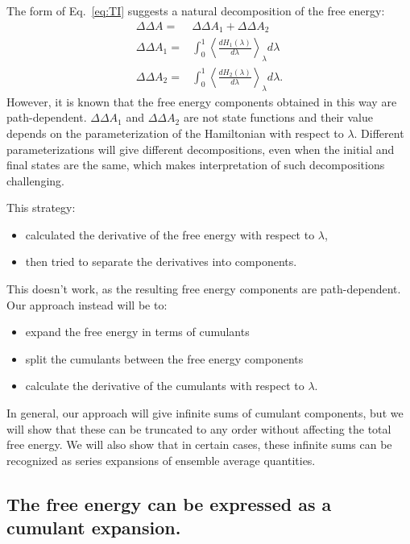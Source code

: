 \documentclass{article}
\begin{document}
The form of Eq.~\ref{eq:TI} suggests a natural decomposition of the free energy:
\begin{align}
\Delta\Delta A =& \Delta\Delta A_1 + \Delta\Delta A_2 \nonumber\\
\Delta\Delta A_1 =&
	\int_0^1 \left\langle \frac{dH_1(\lambda)}{d\lambda}\right\rangle_\lambda d\lambda \nonumber\\
\Delta\Delta A_2 =&
	\int_0^1 \left\langle \frac{dH_2(\lambda)}{d\lambda}\right\rangle_\lambda d\lambda.    
\label{eq:naive}
\end{align}
However, it is known that the free energy components obtained in this way are path-dependent. $\Delta\Delta A_1$ and $\Delta\Delta A_2$ are not state functions and their value depends on the parameterization of the Hamiltonian with respect to $\lambda$. Different parameterizations will give different decompositions, even when the initial and final states are the same, which makes interpretation of such decompositions challenging.

This strategy:
\begin{itemize}
\item calculated the derivative of the free energy with respect to $\lambda$,
\item then tried to separate the derivatives into components.
\end{itemize}
This doesn't work, as the resulting free energy components are path-dependent. Our approach instead will be to:
\begin{itemize}
\item expand the free energy in terms of cumulants
\item split the cumulants between the free energy components
\item calculate the derivative of the cumulants with respect to $\lambda$.
\end{itemize}
In general, our approach will give infinite sums of cumulant components, but we will show that these can be truncated to any order without affecting the total free energy. We will also show that in certain cases, these infinite sums can be recognized as series expansions of ensemble average quantities.





\subsection{The free energy can be expressed as a cumulant expansion.}
\end{document}

